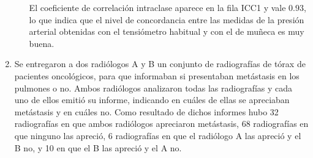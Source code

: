 \begin{enumerate}[leftmargin=*]
\begin{enumerate}
\begin{indicacion}
El coeficiente de correlación intraclase aparece en la fila ICC1 y vale $0.93$, lo que indica que el nivel de
concordancia entre las medidas de la presión arterial obtenidas con el tensiómetro habitual y con el de muñeca es muy
buena.
\end{indicacion}

% 
\end{enumerate}


\item Se entregaron a dos radiólogos A y B un conjunto de radiografías de tórax de pacientes oncológicos, para que
informaban si presentaban metástasis en los pulmones o no. Ambos radiólogos analizaron todas las radiografías y cada uno
de ellos emitió su informe, indicando en cuáles de ellas se apreciaban metástasis y en cuáles no. Como resultado de
dichos informes hubo 32 radiografías en que ambos radiólogos apreciaron metástasis, 68 radiografías en que ninguno las
apreció, 6 radiografías en que el radiólogo A las apreció y el B no, y 10 en que el B las apreció y el A no.


\end{enumerate}
